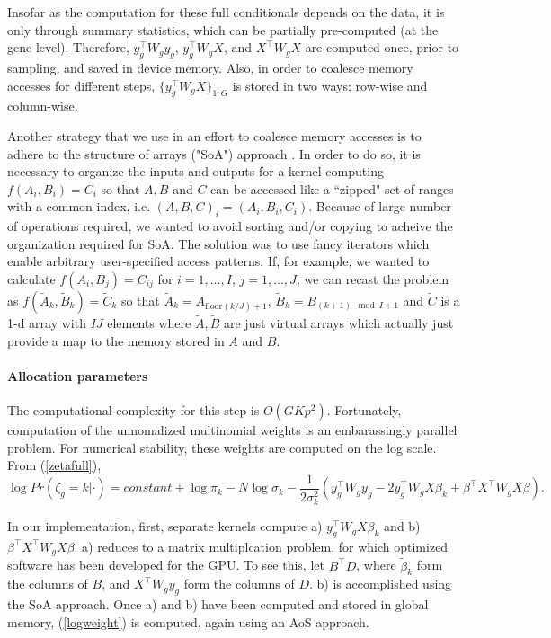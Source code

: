 Insofar as the computation for these full conditionals depends on the data, it is only through summary statistics, which can be partially pre-computed (at the gene level). Therefore, $y_g^\top W_g y_g$, $y_g^\top W_g X$, and $X^\top W_g X$ are computed once, prior to sampling, and saved in device memory. Also, in order to coalesce memory accesses for different steps, $\{y_g^\top W_g X\}_{1:G}$ is stored in two ways; row-wise and column-wise.

Another strategy that we use in an effort to coalesce memory accesses is to adhere to the structure of arrays ("SoA") approach \citep{thrustslides}. In order to do so, it is necessary to organize the inputs and outputs for a kernel computing $f(A_i,B_i)=C_i$ so that $A, B$ and $C$ can be accessed like a ``zipped" set of ranges with a common index, i.e. $(A,B,C)_i = (A_i,B_i,C_i)$. Because of large number of operations required, we wanted to avoid sorting and/or copying to acheive the organization required for SoA. The solution was to use fancy iterators which enable arbitrary user-specified access patterns. If, for example, we wanted to calculate $f(A_i,B_j)=C_{ij}$ for $i=1,\ldots,I$, $j=1,\ldots,J$, we can recast the problem as $f(\tilde{A}_k,\tilde{B}_k)=\tilde{C}_k$ so that $\tilde{A}_k=A_{\mbox{floor}(k/J)+1}$, $\tilde{B}_k=B_{(k+1) \mod I +1}$ and $\tilde{C}$ is a 1-d array with $IJ$ elements where $\tilde{A},\tilde{B}$ are just virtual arrays which actually just provide a map to the memory stored in $A$ and $B$. 

\paragraph{Allocation parameters}
The computational complexity for this step is $O(GKp^2)$. Fortunately, computation of the unnomalized multinomial weights is an embarassingly parallel problem. For numerical stability, these weights are computed on the log scale. From (\ref{zetafull}),
\begin{equation}
\label{logweight}
\log Pr(\zeta_g=k|\cdot) = constant + \log \pi_k -N \log \sigma_k - \frac{1}{2\sigma^2_k}\left(y_g^\top W_g y_g - 2y_g^\top W_g X \beta_k + \beta^\top X^\top W_g X \beta \right).
\end{equation}

In our implementation, first, separate kernels compute a) $y_g^\top W_g X \beta_k$ and b) $\beta^\top X^\top W_g X \beta$. a) reduces to a matrix multiplcation problem, for which optimized software has been developed for the GPU. To see this, let $B^\top D$, where $\tilde{\beta}_k$ form the columns of $B$, and $X^\top W_g y_g$ form the columns of $D$. b) is accomplished using the SoA approach. Once a) and b) have been computed and stored in global memory, (\ref{logweight}) is computed, again using an AoS approach.

